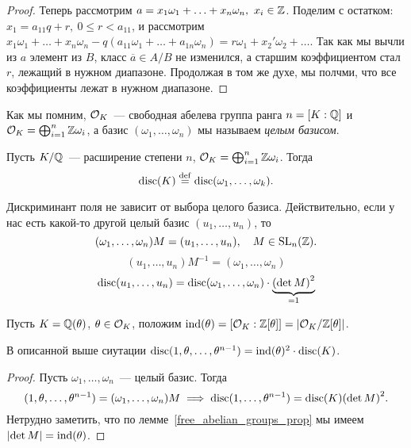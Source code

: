 \begin{definition}
\begin{proof}
			Теперь рассмотрим $a = x_1 \omega_1 + \ldots + x_n \omega_n, \ x_i \in \Z$. Поделим с остатком: $x_1 = a_{11}q + r, \ 0 \le r  < a_{11}$, и рассмотрим $x_{1} \omega_{1} + \ldots + x_n \omega_n - q(a_{11}\omega_1 + \ldots + a_{1n}\omega_n) = r\omega_1 + x_{2}'\omega_{2} + \ldots$.  Так как мы вычли из $a$ элемент из $B$, класс $\overline{a} \in A/B$ не изменился, а старшим коэффициентом стал $r$, лежащий в нужном диапазоне. Продолжая в том же духе, мы полчми, что все коэффициенты лежат в нужном диапазоне. 
		\end{proof}

		Как мы помним, $\cO_{K}$~--- свободная абелева группа ранга $n = [K : \Q]$ и $\cO_{K} = \bigoplus_{i = 1}^{n} \Z \omega_{i}$, а  базис $(\omega_{1}, \ldots, \omega_{n})$ мы называем \emph{целым базисом}.

		\begin{definition} 
			Пусть $K/\Q$~--- расширение степени $n$,  $\cO_{K} = \bigoplus_{i = 1}^{n} \Z \omega_{i}$. Тогда 
			\[
				\disc(K) \eqdef \disc\lr*{\omega_{1}, \ldots, \omega_{k}}.
			\]
		\end{definition}
	
		\begin{remark}
			Дискриминант поля не зависит от выбора целого базиса. Действительно, если у нас есть какой-то другой целый базис $(u_1, \ldots, u_n)$, то 
			\[
				(\omega_{1}, \ldots, \omega_{n})M = (u_1, \ldots, u_n), \quad M \in \mathrm{SL}_{n}(\Z).
			\]
			\[
				 (u_1, \ldots, u_n)M^{-1} = (\omega_{1}, \ldots, \omega_{n}) 
			\]
			\[
				\disc(u_1, \ldots, u_n) = \disc(\omega_1, \ldots, \omega_n) \cdot \underbrace{\lr*{\det{M}}^{2}}_{= 1}
			\]
		\end{remark}

		Пусть $K = \Q(\theta)$, $\theta \in \cO_{K}$, положим $\ind(\theta) = [\cO_{K} : \Z[\theta]] = \left\lvert \cO_{K}/\Z[\theta] \right\rvert$. 

		\begin{statement}\label{dic_and_ind} 
			В описанной выше сиутации $\disc(1, \theta, \ldots, \theta^{n - 1}) = \ind(\theta)^{2} \cdot \disc(K)$.
		\end{statement}
		\begin{proof}
			Пусть $\omega_{1}, \ldots, \omega_{n}$~--- целый базис. Тогда 
			\[
				(1, \theta, \ldots, \theta^{n - 1}) = (\omega_{1}, \ldots, \omega_{n})M \implies \disc(1, \ldots, \theta^{n - 1}) = \disc(K) \lr*{\det{M}}^{2}.
			\]
			Нетрудно заметить, что по лемме~\ref{free_abelian_groups_prop} мы имеем $\left\lvert \det{M} \right\rvert = \ind(\theta)$.
			

\end{proof}
\end{definition}
